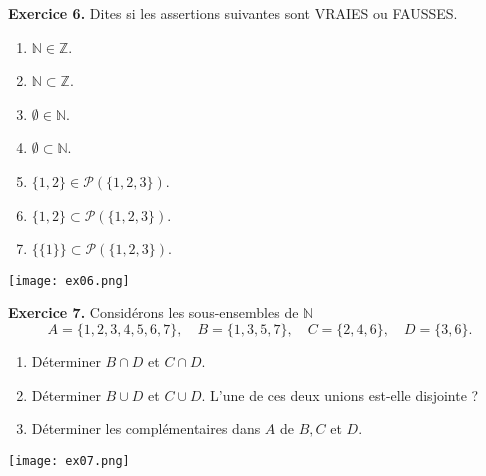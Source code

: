 \documentclass[a4paper, 10pt]{report}
\begin{document}
	\vspace{5mm}
	\noindent
	\textbf{Exercice 6.} Dites si les assertions suivantes sont
	VRAIES ou FAUSSES.
	\begin{enumerate}[label=(\roman*)]
		\item $\mathbb{N} \in \mathbb{Z}$.
		\item $\mathbb{N} \subset \mathbb{Z}$.
		\item $\emptyset \in \mathbb{N}$.
		\item $\emptyset \subset \mathbb{N}$.
		\item $\{1,2\} \in \mathcal{P}(\{1,2,3\})$.
		\item $\{1,2\} \subset \mathcal{P}(\{1,2,3\})$.
		\item $\{\{1\}\} \subset \mathcal{P}(\{1,2,3\})$.
	\end{enumerate}
	
	\texttt{[image: ex06.png]}
	
	\vspace{5mm}
	\noindent
	\textbf{Exercice 7.} Considérons les sous-ensembles de $\mathbb{N}$
	\[
		A = \{1,2,3,4,5,6,7\}, \quad B = \{1,3,5,7\}, \quad
			C = \{2,4,6\}, \quad D = \{3,6\}.
	\]
	\begin{enumerate}[label=(\roman*)]
		\item Déterminer $B \cap D$ et $C \cap D$.
		\item Déterminer $B \cup D$ et $C \cup D$. L'une de
		ces deux unions est-elle disjointe ?
		\item Déterminer les complémentaires dans $A$ de $B, C$ et $D$.
	\end{enumerate}
	
	\texttt{[image: ex07.png]}
	
\end{document}
